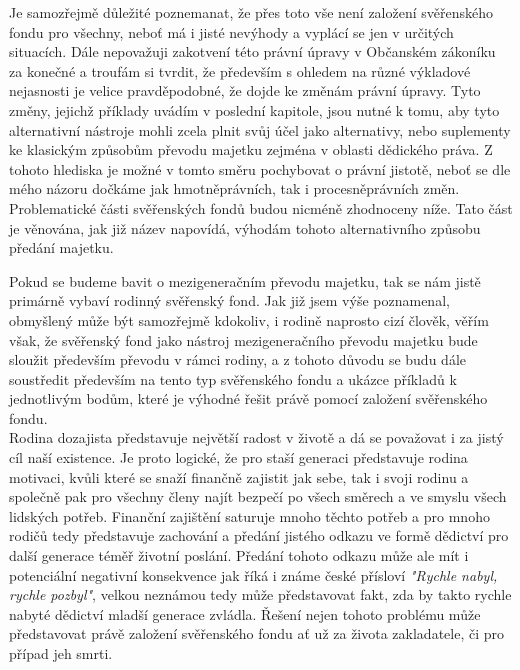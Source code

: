 \documentclass{article}
\begin{document}
Je samozřejmě důležité poznemanat, že přes toto vše není založení svěřenského fondu pro všechny, neboť má i jisté nevýhody a vyplácí se jen v určitých situacích. Dále nepovažuji zakotvení této právní úpravy v Občanském zákoníku za konečné a troufám si tvrdit, že především s ohledem na různé výkladové nejasnosti je velice pravděpodobné, že dojde ke změnám právní úpravy. Tyto změny, jejichž příklady uvádím v poslední kapitole, jsou nutné k tomu, aby tyto alternativní nástroje mohli zcela plnit svůj účel jako alternativy, nebo suplementy ke klasickým způsobům převodu majetku zejména v oblasti dědického práva. Z tohoto hlediska je možné v tomto směru pochybovat o právní jistotě, neboť se dle mého názoru dočkáme jak hmotněprávních, tak i procesněprávních změn.\\

 Problematické části svěřenských fondů budou nicméně zhodnoceny níže. Tato část je věnována, jak již název napovídá, výhodám tohoto alternativního způsobu předání majetku. 
 
 Pokud se budeme bavit o mezigeneračním převodu majetku, tak se nám jistě primárně vybaví rodinný svěřenský fond. Jak již jsem výše poznamenal, obmyšlený může být samozřejmě kdokoliv, i rodině naprosto cizí člověk, věřím však, že svěřenský fond jako nástroj mezigeneračního převodu majetku bude sloužit především převodu v rámci rodiny, a z tohoto důvodu se budu dále soustředit především na tento typ svěřenského fondu a ukázce příkladů k jednotlivým bodům, které je výhodné řešit právě pomocí založení svěřenského fondu.\\
 
 
 Rodina dozajista představuje největší radost v životě a dá se považovat i za jistý cíl naší existence. Je proto logické, že pro staší generaci představuje rodina motivaci, kvůli které se snaží finančně zajistit jak sebe, tak i svoji rodinu a společně pak pro všechny členy najít bezpečí po všech směrech a ve smyslu všech lidských potřeb. Finanční zajištění saturuje mnoho těchto potřeb a pro mnoho rodičů tedy představuje zachování a předání jistého odkazu ve formě dědictví pro další generace téměř životní poslání. Předání tohoto odkazu může ale mít i potenciální negativní konsekvence jak říká i známe české přísloví \textit{"Rychle nabyl, rychle pozbyl"}, velkou neznámou tedy může představovat fakt, zda by takto rychle nabyté dědictví mladší generace zvládla. Řešení nejen tohoto problému může představovat právě založení svěřenského fondu ať už za života zakladatele, či pro případ jeh smrti.\\
 
\end{document}
